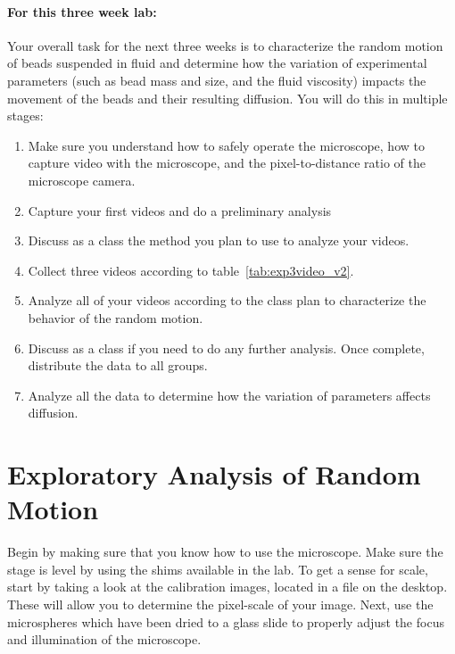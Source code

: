 \paragraph{For this three week lab:} Your overall task for the next three weeks is to characterize the random motion of beads suspended in fluid and determine how the variation of experimental parameters (such as bead mass and size, and the fluid viscosity) impacts the movement of the beads and their resulting diffusion.
You will do this in multiple stages:
\begin{enumerate}
\item Make sure you understand how to safely operate the microscope, how to capture video with the microscope, and the pixel-to-distance ratio of the microscope camera.
\item Capture your first videos and do a preliminary analysis
\item Discuss as a class the method you plan to use to analyze your videos.
\item Collect three videos according to table~\ref{tab:exp3video_v2}.
\item Analyze all of your videos according to the class plan to characterize the behavior of the random motion.
\item Discuss as a class if you need to do any further analysis. Once complete, distribute the data to all groups.
\item Analyze all the data to determine how the variation of parameters affects diffusion.
\end{enumerate}

\section{Exploratory Analysis of Random Motion}
Begin by making sure that you know how to use the microscope.
Make sure the stage is level by using the shims available in the lab.
To get a sense for scale, start by taking a look at the calibration images, located in a file on the desktop.
These will allow you to determine the pixel-scale of your image.
Next, use the microspheres which have been dried to a glass slide to properly adjust the focus and illumination of the microscope.
